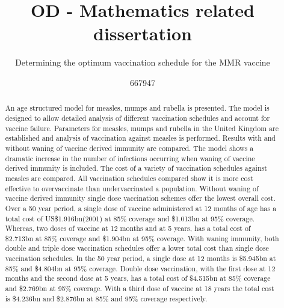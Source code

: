 \documentclass[a4paper,11pt] {scrartcl}
\title{OD - Mathematics related dissertation}
\subtitle{Determining the optimum vaccination schedule for the MMR vaccine}
\author{667947}
\begin{document}
\maketitle
\thispagestyle{empty}
\begin{abstract}
\doublespacing
An age structured model for measles, mumps and rubella is presented. The model is designed to allow detailed analysis of different vaccination schedules and account for vaccine failure. Parameters for measles, mumps and rubella in the United Kingdom are established and analysis of vaccination against measles is performed. Results with and without waning of vaccine derived immunity are compared. The model shows a dramatic increase in the number of infections occurring when  waning of vaccine derived immunity is included. The cost of a variety of vaccination schedules against measles are compared. All vaccination schedules compared show it is more cost effective to overvaccinate than undervaccinated a population. Without waning of vaccine derived immunity single dose vaccination schemes offer the lowest overall cost. Over a 50 year period, a single dose of vaccine administered at 12 months of age has a total cost of US\$1.916bn(2001) at 85\% coverage and \$1.013bn at 95\% coverage. Whereas, two doses of vaccine at 12 months and at 5 years, has a total cost of \$2.713bn at 85\% coverage and \$1.904bn at 95\% coverage. With waning immunity, both double and triple dose vaccination schedules offer a lower total cost than single dose vaccination schedules. In the 50 year period, a single dose at 12 months is \$5.945bn at 85\% and \$4.804bn at 95\% coverage. Double dose vaccination, with the first dose at 12 months and the second dose at 5 years, has a total cost of \$4.515bn at 85\% coverage and \$2.769bn at 95\% coverage. With a third dose of vaccine at 18 years the total cost is \$4.236bn and \$2.876bn at 85\% and 95\% coverage respectively.
\end{abstract}

\newpage
\setcounter{page}{1}
\tableofcontents

\newpage
\setcounter{page}{1}
\doublespacing
\end{document}
